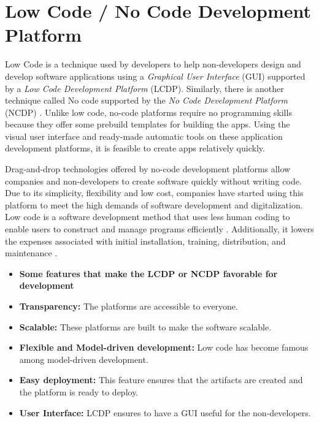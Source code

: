 
\section{Low Code / No Code Development Platform}
\label{background:section:lowcode}
Low Code is a technique used by developers to help non-developers design and develop software applications using a \textit{Graphical User Interface} (GUI) supported by a \textit{Low Code Development Platform} (LCDP).
Similarly, there is another technique called No code supported by the \textit{No Code Development Platform} (NCDP) \cite{article:nocode:miller}.
Unlike low code, no-code platforms require no programming skills because they offer some prebuild templates for building the apps.
Using the visual user interface and ready-made automatic tools on these application development platforms, it is feasible to create apps relatively quickly. 

Drag-and-drop technologies offered by no-code development platforms allow companies and non-developers to create software quickly without writing code.
Due to its simplicity, flexibility and low cost, companies have started using this platform to meet the high demands of software development and digitalization.
Low code is a software development method that uses less human coding to enable users to construct and manage programs efficiently \cite{article:nocode:sahina}.
Additionally, it lowers the expenses associated with initial installation, training, distribution, and maintenance \cite{article:nocode:sanchi}.

\begin{itemize}
  \item[] \textbf{Some features that make the LCDP or NCDP favorable for development}
  \item \textbf{Transparency:} \cite{article:nocode:sahina} The platforms are accessible to everyone.
  \item \textbf{Scalable:} \cite{article:nocode:ihirwe, article:nocode:sahina} These platforms are built to make the software scalable.
  \item \textbf{Flexible and Model-driven development:} \cite{paper:lowcode:cabot} Low code has become famous among model-driven development.
  \item \textbf{Easy deployment:} \cite{article:nocode:ihirwe} This feature ensures that the artifacts are created and the platform is ready to deploy.
  \item \textbf{User Interface:} \cite{article:nocode:sahina} LCDP ensures to have a GUI useful for the non-developers.
\end{itemize}

